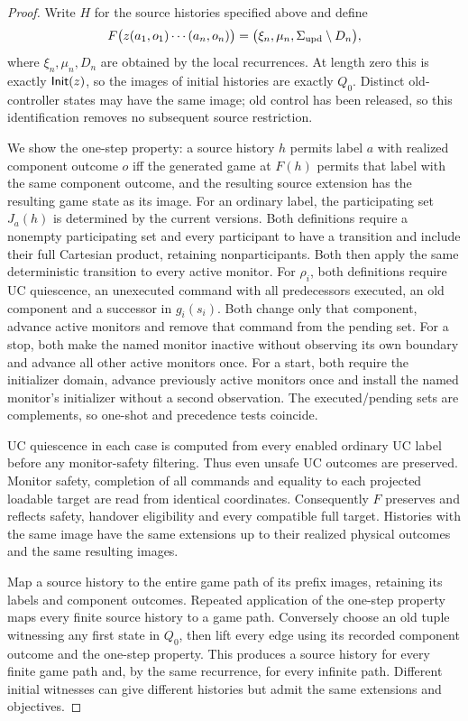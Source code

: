\begin{proof}
Write $H$ for the source histories specified above and define
\[
 F\bigl(z(a_1,o_1)\cdots(a_n,o_n)\bigr)
 =\bigl(\xi_n,\mu_n,\Sigma_{\mathrm{upd}}\setminus D_n\bigr),
\]
where $\xi_n,\mu_n,D_n$ are obtained by the local recurrences. At length zero this is exactly $\mathsf{Init}(z)$, so the images of initial histories are exactly $Q_0$. Distinct old-controller states may have the same image; old control has been released, so this identification removes no subsequent source restriction.

We show the one-step property: a source history $h$ permits label $a$ with realized component outcome $o$ iff the generated game at $F(h)$ permits that label with the same component outcome, and the resulting source extension has the resulting game state as its image. For an ordinary label, the participating set $J_a(h)$ is determined by the current versions. Both definitions require a nonempty participating set and every participant to have a transition and include their full Cartesian product, retaining nonparticipants. Both then apply the same deterministic transition to every active monitor. For $\rho_i$, both definitions require UC quiescence, an unexecuted command with all predecessors executed, an old component and a successor in $g_i(s_i)$. Both change only that component, advance active monitors and remove that command from the pending set. For a stop, both make the named monitor inactive without observing its own boundary and advance all other active monitors once. For a start, both require the initializer domain, advance previously active monitors once and install the named monitor's initializer without a second observation. The executed/pending sets are complements, so one-shot and precedence tests coincide.

UC quiescence in each case is computed from every enabled ordinary UC label before any monitor-safety filtering. Thus even unsafe UC outcomes are preserved. Monitor safety, completion of all commands and equality to each projected loadable target are read from identical coordinates. Consequently $F$ preserves and reflects safety, handover eligibility and every compatible full target. Histories with the same image have the same extensions up to their realized physical outcomes and the same resulting images.

Map a source history to the entire game path of its prefix images, retaining its labels and component outcomes. Repeated application of the one-step property maps every finite source history to a game path. Conversely choose an old tuple witnessing any first state in $Q_0$, then lift every edge using its recorded component outcome and the one-step property. This produces a source history for every finite game path and, by the same recurrence, for every infinite path. Different initial witnesses can give different histories but admit the same extensions and objectives.


\end{proof}
